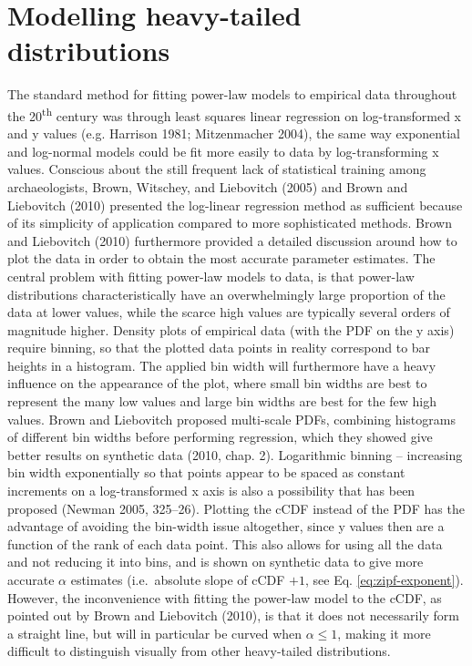 \documentclass[
  12pt,
  a4paper, twoside]{book}
\begin{document}
\hypertarget{modelling-heavy-tailed-distributions}{%
\section{Modelling heavy-tailed distributions}\label{modelling-heavy-tailed-distributions}}

The standard method for fitting power-law models to empirical data throughout the 20\textsuperscript{th} century was through least squares linear regression on log-transformed x and y values (e.g. Harrison 1981; Mitzenmacher 2004), the same way exponential and log-normal models could be fit more easily to data by log-transforming x values. Conscious about the still frequent lack of statistical training among archaeologists, Brown, Witschey, and Liebovitch (2005) and Brown and Liebovitch (2010) presented the log-linear regression method as sufficient because of its simplicity of application compared to more sophisticated methods. Brown and Liebovitch (2010) furthermore provided a detailed discussion around how to plot the data in order to obtain the most accurate parameter estimates. The central problem with fitting power-law models to data, is that power-law distributions characteristically have an overwhelmingly large proportion of the data at lower values, while the scarce high values are typically several orders of magnitude higher. Density plots of empirical data (with the PDF on the y axis) require binning, so that the plotted data points in reality correspond to bar heights in a histogram. The applied bin width will furthermore have a heavy influence on the appearance of the plot, where small bin widths are best to represent the many low values and large bin widths are best for the few high values. Brown and Liebovitch proposed multi-scale PDFs, combining histograms of different bin widths before performing regression, which they showed give better results on synthetic data (2010, chap. 2). Logarithmic binning -- increasing bin width exponentially so that points appear to be spaced as constant increments on a log-transformed x axis is also a possibility that has been proposed (Newman 2005, 325--26). Plotting the cCDF instead of the PDF has the advantage of avoiding the bin-width issue altogether, since y values then are a function of the rank of each data point. This also allows for using all the data and not reducing it into bins, and is shown on synthetic data to give more accurate \(\alpha\) estimates (i.e.~absolute slope of cCDF \(+ 1\), see Eq. \eqref{eq:zipf-exponent}). However, the inconvenience with fitting the power-law model to the cCDF, as pointed out by Brown and Liebovitch (2010), is that it does not necessarily form a straight line, but will in particular be curved when \(\alpha \leq 1\), making it more difficult to distinguish visually from other heavy-tailed distributions.
\end{document}
